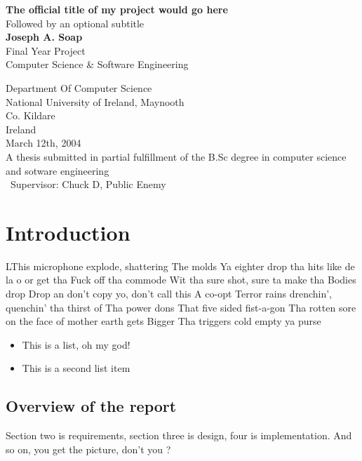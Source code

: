 \documentclass[12pt,a4paper]{report}
\begin{document}
\begin{titlepage}
\begin{center}
\Huge{\textbf{The official title of my project would go here}}\\
\Large{Followed by an optional subtitle}\\
\vspace{5mm}
\Large{\textbf{Joseph A. Soap}}\\
\vspace{5mm}
\Large{Final Year Project}\\
\Large{Computer Science \& Software Engineering}\\
\vspace{5mm}
\begin{figure}[h]
\begin{center}
\end{center}
\end{figure}
\Large{Department Of Computer Science}\\
\Large{National University of Ireland, Maynooth}\\
\Large{Co. Kildare}\\
\Large{Ireland}\\
\Large{March 12th, 2004}\\
\vspace{10mm}
\large{A thesis submitted in partial fulfillment of the B.Sc degree in
computer science and sotware engineering}\\\
\Large{Supervisor: Chuck D, Public Enemy}

\end{center}
\end{titlepage}


\tableofcontents
\chapter{Introduction}
LThis microphone explode, shattering The molds  Ya eighter drop tha hits like de la o or get tha Fuck 
off tha commode Wit tha sure shot, sure ta make tha  Bodies drop Drop an don’t copy yo, don’t call this
  A co-opt  Terror rains drenchin’, quenchin’ tha thirst of  Tha power dons  That five sided fist-a-gon  
Tha rotten sore on the face of mother earth gets Bigger  Tha triggers cold empty ya purse
\begin{itemize}
\item
This is a list, oh my god!
\item
This is a second list item
\end{itemize}
\section{Overview of the report}
Section two is requirements, section three is design, four is implementation. And so on, you get the picture, don't you ?
\end{document}
